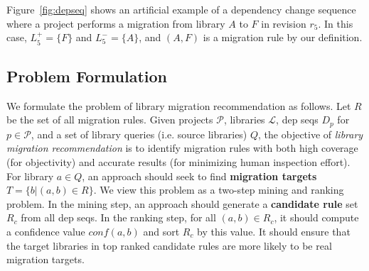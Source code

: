 \documentclass[conference, 10pt]{IEEEtran}
\begin{document}
Figure~\ref{fig:depseq} shows an artificial example of a dependency change sequence where a project performs a migration from library $A$ to $F$ in revision $r_5$. 
In this case, $L_5^+=\{F\}$ and $L_5^-=\{A\}$, and $(A, F)$ is a migration rule by our definition.

\subsection{Problem Formulation}

We formulate the problem of library migration recommendation as follows.
Let $R$ be the set of all migration rules. 
Given projects $\mathcal{P}$, libraries $\mathcal{L}$, dep seqs $D_p$ for $p \in \mathcal{P}$, and a set of library queries (i.e. source libraries) $Q$, the objective of \textit{library migration recommendation} is to identify migration rules with both high coverage (for objectivity) and accurate results (for minimizing human inspection effort). 
For library $a \in Q$, an approach should seek to find \textbf{migration targets} $T=\{b|(a,b)\in R\}$. We view this problem as a two-step mining and ranking problem. In the mining step, an approach should generate a \textbf{candidate rule} set $R_c$ from all dep seqs. In the ranking step, for all $(a,b)\in R_c$, it should compute a confidence value $conf(a,b)$ and sort $R_c$ by this value. It should ensure that the target libraries in top ranked candidate rules are more likely to be real migration targets.
\end{document}
